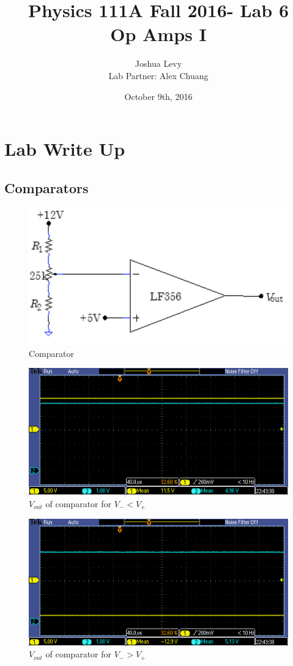 \documentclass{article}
\title{Physics 111A Fall 2016- Lab 6\\
Op Amps I}
\author{Joshua Levy\\Lab Partner: Alex Chuang}
\date{October 9th, 2016}
\begin{document}
\maketitle

\section{Lab Write Up}

\subsection{Comparators}
    \begin{figure}[H]
        \centering
        \includegraphics[scale = 0.5]{1.png}
        \caption{Comparator ~\cite{webfig}}
        \label{fig:my_label}
    \end{figure}
    \begin{figure}[H]
        \centering
        \includegraphics[scale = 0.7]{1a.PNG}
        \caption{$V_{out}$ of comparator for $V_- < V_+$}
        \label{fig:my_label}
    \end{figure}
    \begin{figure}[H]
        \centering
        \includegraphics[scale = 0.7]{1b.PNG}
        \caption{$V_{out}$ of comparator for $V_- > V_+$}
        \label{fig:my_label}
    \end{figure}
\end{document}
